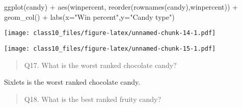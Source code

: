 \documentclass[
]{article}
\newenvironment{Shaded}{\begin{snugshade}}{\end{snugshade}}
\newcommand{\AttributeTok}[1]{\textcolor[rgb]{0.77,0.63,0.00}{#1}}
\newcommand{\FunctionTok}[1]{\textcolor[rgb]{0.00,0.00,0.00}{#1}}
\newcommand{\NormalTok}[1]{#1}
\newcommand{\OtherTok}[1]{\textcolor[rgb]{0.56,0.35,0.01}{#1}}
\newcommand{\SpecialCharTok}[1]{\textcolor[rgb]{0.00,0.00,0.00}{#1}}
\newcommand{\StringTok}[1]{\textcolor[rgb]{0.31,0.60,0.02}{#1}}
\begin{document}
\begin{Shaded}
\begin{Highlighting}[]
\FunctionTok{ggplot}\NormalTok{(candy) }\SpecialCharTok{+}
  \FunctionTok{aes}\NormalTok{(winpercent, }\FunctionTok{reorder}\NormalTok{(}\FunctionTok{rownames}\NormalTok{(candy),winpercent)) }\SpecialCharTok{+}
  \FunctionTok{geom\_col}\NormalTok{() }\SpecialCharTok{+} \FunctionTok{labs}\NormalTok{(}\AttributeTok{x=}\StringTok{"Win percent"}\NormalTok{,}\AttributeTok{y=}\StringTok{"Candy type"}\NormalTok{)}
\end{Highlighting}
\end{Shaded}

\texttt{[image: class10\_files/figure-latex/unnamed-chunk-14-1.pdf]}

\begin{Shaded}
\end{Shaded}

\texttt{[image: class10\_files/figure-latex/unnamed-chunk-15-1.pdf]}

\begin{quote}
Q17. What is the worst ranked chocolate candy?
\end{quote}

Sixlets is the worst ranked chocolate candy.

\begin{quote}
Q18. What is the best ranked fruity candy?
\end{quote}
\end{document}
